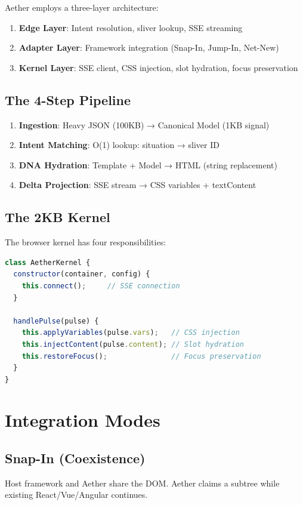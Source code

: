 \documentclass[11pt]{article}
\begin{document}
Aether employs a three-layer architecture:

\begin{enumerate}
  \item \textbf{Edge Layer}: Intent resolution, sliver lookup, SSE streaming
  \item \textbf{Adapter Layer}: Framework integration (Snap-In, Jump-In, Net-New)
  \item \textbf{Kernel Layer}: SSE client, CSS injection, slot hydration, focus preservation
\end{enumerate}

\subsection{The 4-Step Pipeline}

\begin{enumerate}
  \item \textbf{Ingestion}: Heavy JSON (100KB) → Canonical Model (1KB signal)
  \item \textbf{Intent Matching}: O(1) lookup: situation → sliver ID
  \item \textbf{DNA Hydration}: Template + Model → HTML (string replacement)
  \item \textbf{Delta Projection}: SSE stream → CSS variables + textContent
\end{enumerate}

\subsection{The 2KB Kernel}

The browser kernel has four responsibilities:

\begin{lstlisting}[language=JavaScript, caption=Kernel Core]
class AetherKernel {
  constructor(container, config) {
    this.connect();     // SSE connection
  }

  handlePulse(pulse) {
    this.applyVariables(pulse.vars);   // CSS injection
    this.injectContent(pulse.content); // Slot hydration
    this.restoreFocus();               // Focus preservation
  }
}
\end{lstlisting}

\section{Integration Modes}

\subsection{Snap-In (Coexistence)}
Host framework and Aether share the DOM. Aether claims a subtree while existing React/Vue/Angular continues.
\end{document}
